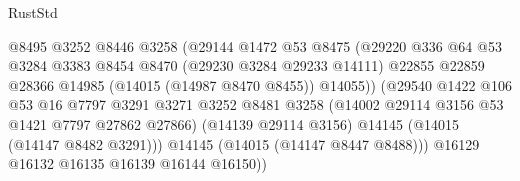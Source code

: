 \begin{lexlean}{RustStd}
\begin{coremodule}
                                              @8495
                                              @3252
                                              @8446
                                              @3258
                                              (@29144
                                                @1472
                                                @53
                                                @8475
                                                (@29220
                                                  @336
                                                  @64
                                                  @53
                                                  @3284
                                                  @3383
                                                  @8454
                                                  @8470
                                                  (@29230 @3284 @29233 @14111)
                                                  @22855
                                                  @22859
                                                  @28366
                                                  @14985
                                                  (@14015 (@14987 @8470 @8455))
                                                  @14055))
                                              (@29540
                                                @1422
                                                @106
                                                @53
                                                @16
                                                @7797
                                                @3291
                                                @3271
                                                @3252
                                                @8481
                                                @3258
                                                (@14002 @29114 @3156 @53 @1421 @7797 @27862 @27866)
                                                (@14139 @29114 @3156)
                                                @14145
                                                (@14015 (@14147 @8482 @3291)))
                                              @14145
                                              (@14015 (@14147 @8447 @8488)))
                                            @16129
                                            @16132
                                            @16135
                                            @16139
                                            @16144
                                            @16150))

\end{coremodule}
\end{lexlean}
